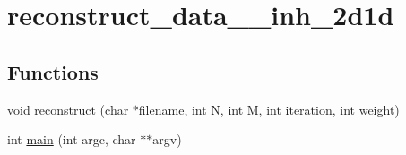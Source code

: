 \hypertarget{group__applications__mri2d__reconstruct__data__inh__2d1d}{
\section{reconstruct\_\-data\_\-\_\-inh\_\-2d1d}
\label{group__applications__mri2d__reconstruct__data__inh__2d1d}
}
\subsection*{Functions}
\begin{CompactItemize}
\item 
\hypertarget{group__applications__mri2d__reconstruct__data__inh__2d1d_g43c01bb9865574fcfee9a1f999713987}{
void \hyperlink{group__applications__mri2d__reconstruct__data__inh__2d1d_g43c01bb9865574fcfee9a1f999713987}{reconstruct} (char $\ast$filename, int N, int M, int iteration, int weight)}
\label{group__applications__mri2d__reconstruct__data__inh__2d1d_g43c01bb9865574fcfee9a1f999713987}

\item 
\hypertarget{group__applications__mri2d__reconstruct__data__inh__2d1d_g3c04138a5bfe5d72780bb7e82a18e627}{
int \hyperlink{group__applications__mri2d__reconstruct__data__inh__2d1d_g3c04138a5bfe5d72780bb7e82a18e627}{main} (int argc, char $\ast$$\ast$argv)}
\label{group__applications__mri2d__reconstruct__data__inh__2d1d_g3c04138a5bfe5d72780bb7e82a18e627}

\end{CompactItemize}
